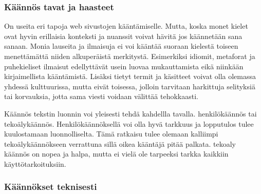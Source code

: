 \documentclass[11pt,a4paper,titlepage,oneside]{article}
\begin{document}
\subsubsection{Käännös tavat ja haasteet}







On useita eri tapoja web sivustojen kääntämiselle.
Mutta, koska monet kielet ovat hyvin erillaisia konteksti ja nuanssit voivat hävitä jos käännetään sana sanaan.
Monia lauseita ja ilmaisuja ei voi kääntää suoraan kielestä toiseen menettämättä niiden alkuperäistä merkitystä.
Esimerkiksi idiomit, metaforat ja puhekieliset ilmaisut edellyttävät usein luovaa mukauttamista eikä niinkään kirjaimellista kääntämistä. 
Lisäksi tietyt termit ja käsitteet voivat olla olemassa yhdessä kulttuurissa, 
mutta eivät toisessa, jolloin tarvitaan harkittuja selityksiä tai korvauksia, jotta sama viesti voidaan välittää tehokkaasti.
\medskip



Käännös tekstin luonnin voi yleisesti tehdä kahdellla tavalla. henkilökäännös tai tekoälykäännös.
Henkilökäännöksellä voi olla hyvä tarkkuus ja lopputulos tulee kuulostamaan luonnolliselta.
Tämä ratkaisu tulee olemaan kalliimpi tekoälykäännökseen verrattuna sillä oikea kääntäjä pitää palkata.
tekoaly käännös on nopea ja halpa, mutta ei vielä ole tarpeeksi tarkka kaikkiin käyttötarkoituksiin.
\medskip









\subsubsection{Käännökset teknisesti}



\end{document}

